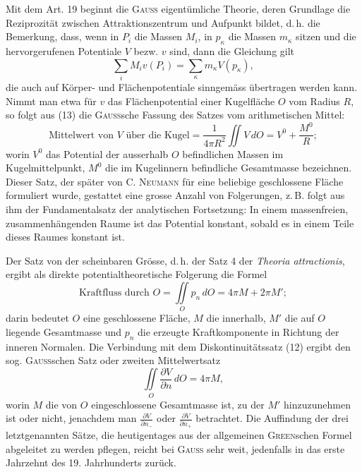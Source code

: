 Mit dem Art. 19 beginnt die \textsc{Gauss} eigentümliche Theorie, deren Grundlage
die Reziprozität zwischen Attraktionszentrum und Aufpunkt bildet, d.\,h.
die Bemerkung, dass, wenn in \(P_i\) die Massen \(M_i\), in \(p_\kappa\) die Massen \(m_\kappa\) sitzen
und die hervorgerufenen Potentiale \(V\) bezw. \(v\) sind, dann die Gleichung gilt
\[
\sum_i M_i v(P_i)=\sum_\kappa m_\kappa V(p_\kappa),\tag{13}
\]
\noindent die auch auf Körper- und Flächenpotentiale sinngemäss übertragen werden
kann. Nimmt man etwa für \(v\) das Flächenpotential einer Kugelfläche \(O\) vom
Radius \(R\), so folgt aus (13) die \textsc{Gauss}sche Fassung des Satzes vom arithmetischen
Mittel:
\begingroup\small
\[
\text{Mittelwert von }V\text{ über die Kugel}=\frac1{4\pi R^2}\iint V\,dO=V^0+\frac{M^0}{R};\tag{14}
\]
\endgroup
\noindent worin \(V^0\) das Potential der ausserhalb \(O\) befindlichen Massen im Kugelmittelpunkt,
\(M^0\) die im Kugelinnern befindliche Gesamtmasse bezeichnen. Dieser
Satz, der später von \textsc{C. Neumann} für eine beliebige geschlossene Fläche formuliert
wurde, gestattet eine grosse Anzahl von Folgerungen, z.\,B. folgt aus
ihm der Fundamentalsatz der analytischen Fortsetzung: In einem massenfreien,
\clearpage{}
\noindent zusammenhängenden Raume ist das Potential konstant, sobald es in einem
Teile dieses Raumes konstant ist.

Der Satz von der scheinbaren Grösse, d.\,h. der Satz 4 der \textit{Theoria attractionis},
ergibt als direkte potentialtheoretische Folgerung die Formel
\[
\text{Kraftfluss durch }O=\iint\limits_O p_n\,dO=4\pi M+2\pi M';\tag{15}
\]
\noindent darin bedeutet \(O\) eine geschlossene Fläche, \(M\) die innerhalb, \(M'\) die auf \(O\)
liegende Gesamtmasse und \(p_n\) die erzeugte Kraftkomponente in Richtung der
inneren Normalen. Die Verbindung mit dem Diskontinuitätssatz (12) ergibt
den sog. \textsc{Gauss}schen Satz oder zweiten Mittelwertsatz
\[
\iint\limits_O\frac{\partial V}{\partial n}\,dO=4\pi M,\tag{16}
\]
\noindent worin \(M\) die von \(O\) eingeschlossene Gesamtmasse ist, zu der \(M'\) hinzuzunehmen
ist oder nicht, jenachdem man \(\frac{\partial V}{\partial n_-}\) oder \(\frac{\partial V}{\partial n_+}\) betrachtet. Die Auffindung der
drei letztgenannten Sätze, die heutigentages aus der allgemeinen \textsc{Green}schen
Formel abgeleitet zu werden pflegen, reicht bei \textsc{Gauss} sehr weit, jedenfalls
in das erste Jahrzehnt des 19. Jahrhunderts zurück.

